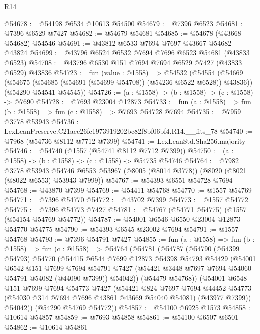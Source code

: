 \begin{lexlean}{R14}
\begin{coremodule}
@54678 := @54198 @6534 @10613 @54500
@54679 := @7396 @6523
@54681 := @7396 @6529 @7427
@54682 := @54679 @54681
@54685 := @54678 (@43668 @54682) @54546
@54691 := @43812 @6533 @7694 @7697 @43667 @54682 @43824
@54699 := @43796 @6524 @6532 @7694 @7696 @6523 @54681 (@43833 @6523)
@54708 := @43796 @6530 @151 @7694 @7694 @6529 @7427 (@43833 @6529) @43836
@54723 := fun (value : @1558) =>
  @54532
    (@54554
      (@54669 (@54675 (@54685 (@54691 (@54699 @54708)) (@54236 @6522 @6528)) @43836))
      (@54290 @54541 @54545))
@54726 := (a : @1558) -> (b : @1558) -> (c : @1558) -> @7690
@54728 := @7693 @23004 @12873
@54733 := fun (a : @1558) => fun (b : @1558) => fun (c : @1558) => @7693 @54728 @7694
@54735 := @7959 @3778 @53943
@54736 := LexLeanPreserve.C21aec26fe1973919202bc82f8bf06bf4.R14.__fits_78
@54740 := @7968 (@54736 @8112 @7712 @7399)
@54741 := LexLeanStd.Sha256.majority
@54746 := @54740 (@1557 (@54741 @8112 @7712 @7399))
@54750 := (a : @1558) -> (b : @1558) -> (c : @1558) -> @54735 @54746
@54764 := @7982
    @3778
    @53943
    @54746
    @6553
    @53967
    (@8005 (@8014 @3778))
    (@8020 (@8021 (@8022 @6553) @53943 @7999))
@54767 := @54393 @6551 @54728 @7694
@54768 := @43870 @7399
@54769 := @54411 @54768
@54770 := @1557 @54769
@54771 := @7396 @54770
@54772 := @43702 @7399
@54773 := @1557 @54772
@54775 := @7396 @54773 @7427
@54781 := @54767 (@54771 @54775) (@1557 (@54154 @54769 @54772))
@54787 := @54001 @6546 @6550 @23004 @12873 @54770 @54775
@54790 := @54393 @6545 @23002 @7694
@54791 := @1557 @54768
@54793 := @7396 @54791 @7427
@54855 := fun (a : @1558) =>
  fun (b : @1558) =>
  fun (c : @1558) =>
  @54764
    (@54781
      (@54787
        (@54790
          (@54399 @54793)
          @54770
          (@54415
            @6544
            @7699
            @12873
            @54398
            @54793
            @54429
            (@54001
              @6542
              @151
              @7699
              @7694
              @54791
              @7427
              (@54421 @3448 @7697 @7694 @54060 @54791 @54082 (@44090 @7399))
              @54042))
          (@54479 @54768))
        (@54001
          @6548
          @151
          @7699
          @7694
          @54773
          @7427
          (@54421
            @824
            @7697
            @7694
            @44452
            @54773
            (@54030 @314 @7694 @7696 @43861 @43669 @54040 @54081)
            (@43977 @7399))
          @54042))
      (@54290 @54769 @54772))
@54857 := @54100 @6925 @1573
@54858 := @10614 @54857
@54859 := @7693 @54858
@54861 := @54100 @6507 @6501
@54862 := @10614 @54861

\end{coremodule}
\end{lexlean}
